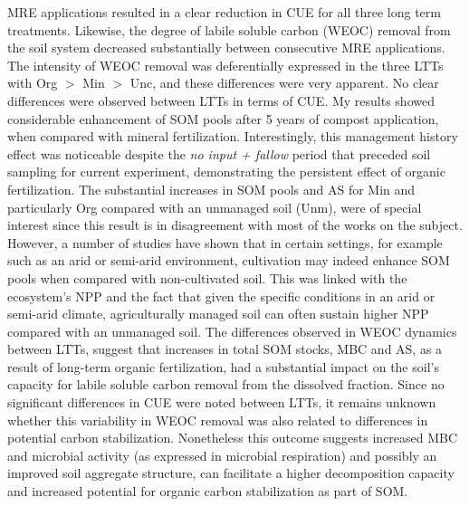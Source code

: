 	MRE applications resulted in a clear reduction in CUE for all three long term treatments. Likewise, the degree of labile soluble carbon (WEOC) removal from the soil system decreased substantially between consecutive MRE applications. The intensity of WEOC removal was deferentially expressed in the three LTTs with Org $  > $ Min $ > $ Unc, and these differences were very apparent. No clear differences were observed between LTTs in terms of CUE.
	My results showed considerable enhancement of SOM pools after 5 years of compost application, when compared with mineral fertilization. Interestingly, this management history effect was noticeable despite the \textit{no input + fallow} period that preceded soil sampling for current experiment, demonstrating the persistent effect of organic fertilization. The substantial increases in SOM pools and AS for Min and particularly Org compared with an unmanaged soil (Unm), were of special interest since this result is in disagreement with most of the works on the subject. However, a number of studies have shown that in certain settings, for example such as an arid or semi-arid environment, cultivation may indeed enhance SOM pools when compared with non-cultivated soil. This was linked with the ecosystem's NPP and the fact that given the specific conditions in an arid or semi-arid climate, agriculturally managed soil can often sustain higher NPP compared with an unmanaged soil.
	The differences observed in WEOC dynamics between LTTs, suggest that increases in total SOM stocks, MBC and AS, as a result of long-term organic fertilization, had a substantial impact on the soil's capacity for labile soluble carbon removal from the dissolved fraction. Since no significant differences in CUE were noted between LTTs, it remains unknown whether this variability in WEOC removal was also related to differences in potential carbon stabilization. Nonetheless this outcome suggests increased MBC and microbial activity (as expressed in microbial respiration) and possibly an improved soil aggregate structure, can facilitate a higher decomposition capacity and increased potential for organic carbon stabilization as part of SOM.
